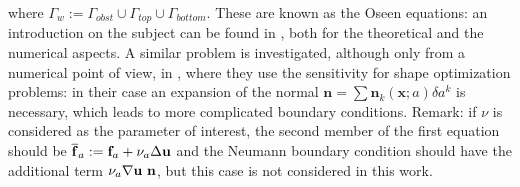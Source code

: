 where $\Gamma_w := \Gamma_{obst} \cup \Gamma_{top} \cup \Gamma_{bottom}$.
These are known as the Oseen equations: an introduction on the subject can be found in \cite{john2014oseen}, both for the theoretical and the numerical aspects. A similar problem is investigated, although only from a numerical point of view, in \cite{duvigneau2005evaluation,duvigneau2006improved}, where they use the sensitivity for shape optimization problems: in their case an expansion of the normal $\mathbf{n} = \sum \mathbf{n}_k(\mathbf{x};a)\delta a^k$ is necessary, which leads to more complicated boundary conditions.
Remark: if $\nu$ is considered as the parameter of interest, the second member of the first equation should be $\overline{\mathbf{f}}_a := \mathbf{f}_a+\nu_a\Delta\b_u$ and the Neumann boundary condition should have the additional term $\nu_a\nabla\b_u\ \mathbf{n}$, but this case is not considered in this work. 

